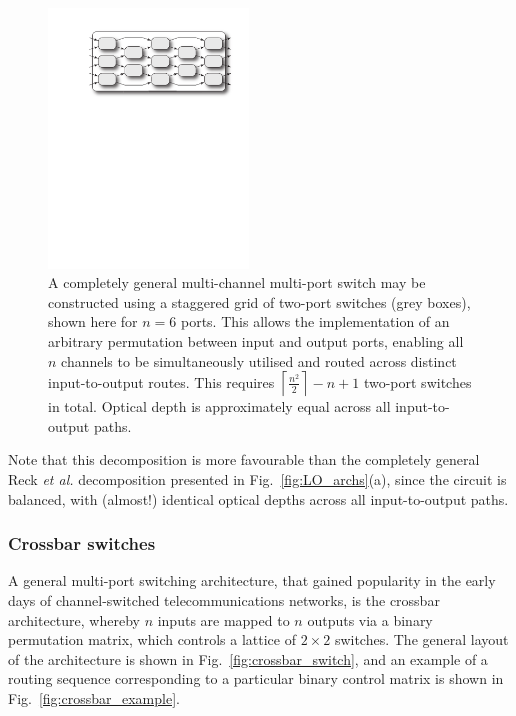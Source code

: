 \begin{figure}[!htbp]
\includegraphics[clip=true, width=0.475\textwidth]{multi_channel_multi_port_switch}
\captionspacefig \caption{A completely general multi-channel multi-port switch may be constructed using a staggered grid of two-port switches (grey boxes), shown here for \mbox{$n=6$} ports. This allows the implementation of an arbitrary permutation between input and output ports, enabling all $n$ channels to be simultaneously utilised and routed across distinct input-to-output routes. This requires \mbox{$\left\lceil \frac{n^2}{2}\right\rceil - n + 1$} two-port switches in total. Optical depth is approximately equal across all input-to-output paths.} \label{fig:multi_channel_multi_port_switch} 	
\end{figure}

Note that this decomposition is more favourable than the completely general Reck \textit{et al.} decomposition presented in Fig.~\ref{fig:LO_archs}(a), since the circuit is balanced, with (almost!) identical optical depths across all input-to-output paths.

%
%

\subsubsection{Crossbar switches}

A general multi-port switching architecture, that gained popularity in the early days of channel-switched telecommunications networks, is the crossbar architecture, whereby $n$ inputs are mapped to $n$ outputs via a binary permutation matrix, which controls a lattice of \mbox{$2\times 2$} switches. The general layout of the architecture is shown in Fig.~\ref{fig:crossbar_switch}, and an example of a routing sequence corresponding to a particular binary control matrix is shown in Fig.~\ref{fig:crossbar_example}.

